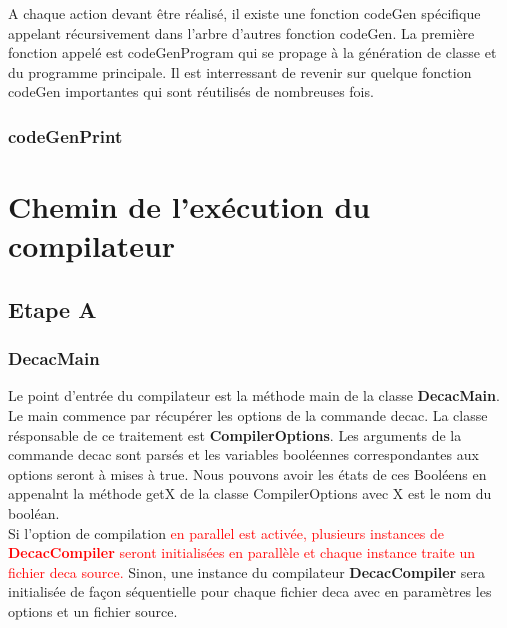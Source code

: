 \documentclass[12pt, a4paper, one side]{article}
\begin{document}
    A chaque action devant être réalisé, il existe une fonction codeGen spécifique appelant récursivement dans l'arbre
    d'autres fonction codeGen. La première fonction appelé est codeGenProgram qui se propage à la génération de classe
    et du programme principale. Il est interressant de revenir sur quelque fonction codeGen importantes qui sont réutilisés
    de nombreuses fois.

    \subsubsection{codeGenPrint}

    \section{Chemin de l'exécution du compilateur}
    \subsection{Etape A}

    \subsubsection{DecacMain}
    Le point d'entrée du compilateur est la méthode main de la classe \textbf {DecacMain}. Le main commence par récupérer les options de la commande decac. La classe résponsable de ce traitement est \textbf{CompilerOptions}. Les arguments de la commande decac sont parsés et les variables booléennes correspondantes aux options seront à mises à true. Nous pouvons avoir les états de ces Booléens en appenalnt la méthode getX de la classe CompilerOptions avec X est le nom du booléan.
    \\
    Si l'option de compilation {\textcolor{red}{ en parallel est activée, plusieurs instances de \textbf{DecacCompiler} seront initialisées en parallèle et chaque instance traite un fichier deca source.}}
    Sinon, une instance du compilateur \textbf{DecacCompiler} sera initialisée de façon séquentielle pour chaque fichier deca avec en paramètres les options et un fichier source.
\end{document}
